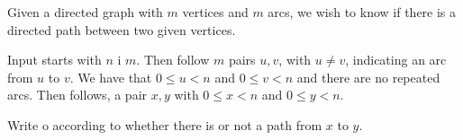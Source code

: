 

\Statement

Given a directed graph with $m$ vertices and $m$ arcs,
we wish to know if there is a directed path between two given vertices.

\Input

Input starts with
 $n$ i $m$.
Then follow $m$ pairs $u,v$, with $u \ne v$, indicating an arc from $u$ to $v$.
We have that $0\le u<n$ and $0\le v<n$ and there are no repeated arcs.
Then follows, a pair $x,y$
with $0\le x<n$ and $0\le y <n$.


\Output


Write  o 
according to whether there is or not a path from $x$ to $y$. 

\Sample

